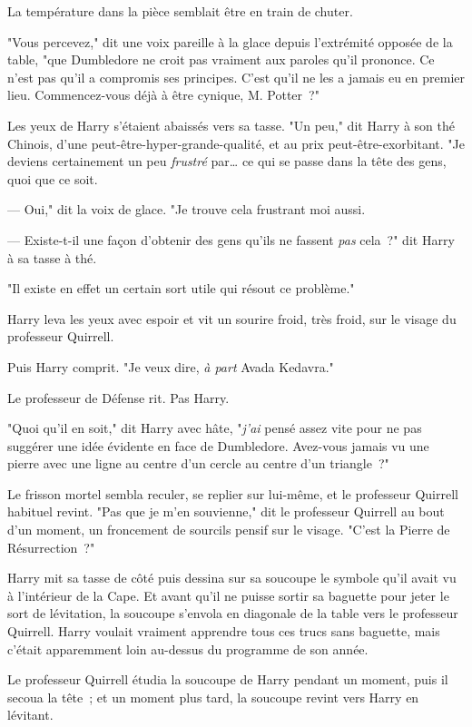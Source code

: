 La température dans la pièce semblait être en train de chuter.

"Vous percevez," dit une voix pareille à la glace depuis l'extrémité opposée de la table, "que Dumbledore ne croit pas vraiment aux paroles qu'il prononce. Ce n'est pas qu'il a compromis ses principes. C'est qu'il ne les a jamais eu en premier lieu. Commencez-vous déjà à être cynique, M. Potter~?"

Les yeux de Harry s'étaient abaissés vers sa tasse. "Un peu," dit Harry à son thé Chinois, d'une peut-être-hyper-grande-qualité, et au prix peut-être-exorbitant. "Je deviens certainement un peu \emph{frustré} par… ce qui se passe dans la tête des gens, quoi que ce soit.

--- Oui," dit la voix de glace. "Je trouve cela frustrant moi aussi.

--- Existe-t-il une façon d'obtenir des gens qu'ils ne fassent \emph{pas} cela~?" dit Harry à sa tasse à thé.

"Il existe en effet un certain sort utile qui résout ce problème."

Harry leva les yeux avec espoir et vit un sourire froid, très froid, sur le visage du professeur Quirrell.

Puis Harry comprit. "Je veux dire, \emph{à part} Avada Kedavra."

Le professeur de Défense rit. Pas Harry.

"Quoi qu'il en soit," dit Harry avec hâte, "\emph{j'ai} pensé assez vite pour ne pas suggérer une idée évidente en face de Dumbledore. Avez-vous jamais vu une pierre avec une ligne au centre d'un cercle au centre d'un triangle~?"

Le frisson mortel sembla reculer, se replier sur lui-même, et le professeur Quirrell habituel revint. "Pas que je m'en souvienne," dit le professeur Quirrell au bout d'un moment, un froncement de sourcils pensif sur le visage. "C'est la Pierre de Résurrection~?"

Harry mit sa tasse de côté puis dessina sur sa soucoupe le symbole qu'il avait vu à l'intérieur de la Cape. Et avant qu'il ne puisse sortir sa baguette pour jeter le sort de lévitation, la soucoupe s'envola en diagonale de la table vers le professeur Quirrell. Harry voulait vraiment apprendre tous ces trucs sans baguette, mais c'était apparemment loin au-dessus du programme de son année.

Le professeur Quirrell étudia la soucoupe de Harry pendant un moment, puis il secoua la tête~; et un moment plus tard, la soucoupe revint vers Harry en lévitant.


